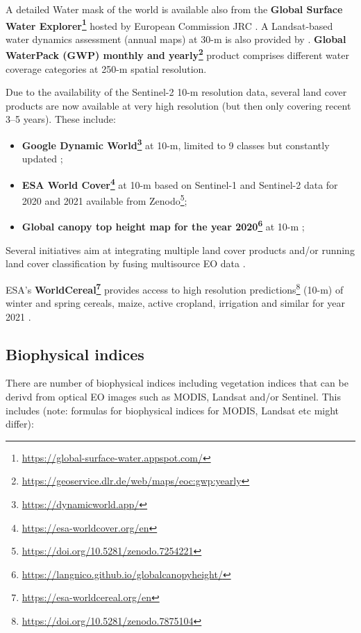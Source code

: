 \documentclass[
  graybox,natbib,nospthms]{svmono}
\providecommand{\tightlist}{%
  \setlength{\itemsep}{0pt}\setlength{\parskip}{0pt}}
\providecommand{\tightlist}{\setlength{\itemsep}{0pt}\setlength{\parskip}{0pt}}
\renewcommand{\href}[2]{#2 (\url{#1})}
\renewcommand{\href}[2]{#2\footnote{\url{#1}}}
\begin{document}
A detailed Water mask of the world is available also from the \textbf{\href{https://global-surface-water.appspot.com/}{Global Surface Water Explorer}} hosted by European Commission JRC
\citep{Pekel2016}. A Landsat-based water
dynamics assessment (annual maps) at 30-m is also provided by \citet{pickens2020mapping}.
\textbf{\href{https://geoservice.dlr.de/web/maps/eoc:gwp:yearly}{Global WaterPack (GWP) monthly and yearly}} product comprises different water coverage categories at 250-m spatial resolution.

Due to the availability of the Sentinel-2 10-m resolution data, several land cover
products are now available at very high resolution (but then only covering recent 3--5 years). These include:

\begin{itemize}
\tightlist
\item
  \textbf{\href{https://dynamicworld.app/}{Google Dynamic World}} at 10-m, limited to 9 classes but constantly updated \citep{Brown2022};
\item
  \textbf{\href{https://esa-worldcover.org/en}{ESA World Cover}} at 10-m based on Sentinel-1 and Sentinel-2 data for 2020 and 2021 available from \href{https://doi.org/10.5281/zenodo.7254221}{Zenodo};\\
\item
  \textbf{\href{https://langnico.github.io/globalcanopyheight/}{Global canopy top height map for the year 2020}} at 10-m \citep{lang2023high};
\end{itemize}

Several initiatives aim at integrating multiple land cover products \citep{rs8121036}
and/or running land cover classification by fusing multisource EO data \citep{Song2017, Liu2021}.

ESA's \textbf{\href{https://esa-worldcereal.org/en}{WorldCereal}} provides access to \href{https://doi.org/10.5281/zenodo.7875104}{high resolution predictions} (10-m)
of winter and spring cereals, maize, active cropland, irrigation and similar for year 2021 \citep{essd-15-5491-2023}.

\hypertarget{biophysical-indices}{%
\subsection{Biophysical indices}\label{biophysical-indices}}

There are number of biophysical indices including vegetation indices
that can be derivd from optical EO images such as MODIS, Landsat and/or Sentinel.
This includes (note: formulas for biophysical indices for MODIS, Landsat etc might differ):
\end{document}
